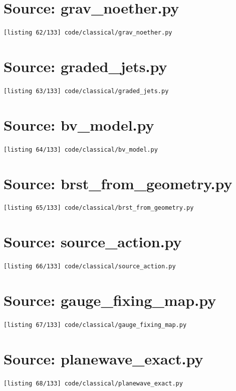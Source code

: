 \section{Source: grav\_noether.py}
\noindent\texttt{[listing 62/133] code/classical/grav\_noether.py}
{\scriptsize}

\section{Source: graded\_jets.py}
\noindent\texttt{[listing 63/133] code/classical/graded\_jets.py}
{\scriptsize}

\section{Source: bv\_model.py}
\noindent\texttt{[listing 64/133] code/classical/bv\_model.py}
{\scriptsize}

\section{Source: brst\_from\_geometry.py}
\noindent\texttt{[listing 65/133] code/classical/brst\_from\_geometry.py}
{\scriptsize}

\section{Source: source\_action.py}
\noindent\texttt{[listing 66/133] code/classical/source\_action.py}
{\scriptsize}

\section{Source: gauge\_fixing\_map.py}
\noindent\texttt{[listing 67/133] code/classical/gauge\_fixing\_map.py}
{\scriptsize}

\section{Source: planewave\_exact.py}
\noindent\texttt{[listing 68/133] code/classical/planewave\_exact.py}
{\scriptsize}

